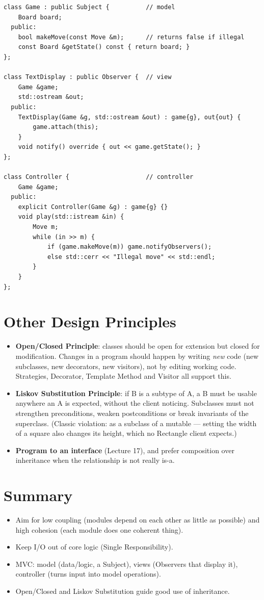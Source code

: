 \begin{lstlisting}[style=cpp]
class Game : public Subject {          // model
    Board board;
  public:
    bool makeMove(const Move &m);      // returns false if illegal
    const Board &getState() const { return board; }
};

class TextDisplay : public Observer {  // view
    Game &game;
    std::ostream &out;
  public:
    TextDisplay(Game &g, std::ostream &out) : game{g}, out{out} {
        game.attach(this);
    }
    void notify() override { out << game.getState(); }
};

class Controller {                     // controller
    Game &game;
  public:
    explicit Controller(Game &g) : game{g} {}
    void play(std::istream &in) {
        Move m;
        while (in >> m) {
            if (game.makeMove(m)) game.notifyObservers();
            else std::cerr << "Illegal move" << std::endl;
        }
    }
};
\end{lstlisting}

\section{Other Design Principles}
\begin{itemize}
  \item \textbf{Open/Closed Principle}: classes should be open for extension
        but closed for modification. Changes in a program should happen by
        writing \emph{new} code (new subclasses, new decorators, new visitors),
        not by editing working code. Strategies, Decorator, Template Method and
        Visitor all support this.
  \item \textbf{Liskov Substitution Principle}: if B is a subtype of A, a B must
        be usable anywhere an A is expected, without the client noticing.
        Subclasses must not strengthen preconditions, weaken postconditions or
        break invariants of the superclass. (Classic violation:  as
        a subclass of a mutable  --- setting the width of a
        square also changes its height, which no Rectangle client expects.)
  \item \textbf{Program to an interface} (Lecture 17), and prefer composition
        over inheritance when the relationship is not really is-a.
\end{itemize}

\section*{Summary}
\begin{itemize}
  \item Aim for low coupling (modules depend on each other as little as
        possible) and high cohesion (each module does one coherent thing).
  \item Keep I/O out of core logic (Single Responsibility).
  \item MVC: model (data/logic, a Subject), views (Observers that display it),
        controller (turns input into model operations).
  \item Open/Closed and Liskov Substitution guide good use of inheritance.
\end{itemize}
